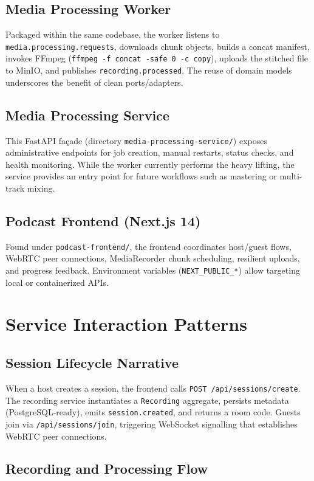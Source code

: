 \documentclass[12pt]{article}
\begin{document}
\subsection{Media Processing Worker}
Packaged within the same codebase, the worker listens to \texttt{media.processing.requests}, downloads chunk objects, builds a concat manifest, invokes FFmpeg (\texttt{ffmpeg -f concat -safe 0 -c copy}), uploads the stitched file to MinIO, and publishes \texttt{recording.processed}. The reuse of domain models underscores the benefit of clean ports/adapters.

\subsection{Media Processing Service}
This FastAPI façade (directory \texttt{media-processing-service/}) exposes administrative endpoints for job creation, manual restarts, status checks, and health monitoring. While the worker currently performs the heavy lifting, the service provides an entry point for future workflows such as mastering or multi-track mixing.

\subsection{Podcast Frontend (Next.js 14)}
Found under \texttt{podcast-frontend/}, the frontend coordinates host/guest flows, WebRTC peer connections, MediaRecorder chunk scheduling, resilient uploads, and progress feedback. Environment variables (\texttt{NEXT\_PUBLIC\_*}) allow targeting local or containerized APIs.

\clearpage
\section{Service Interaction Patterns}

\subsection{Session Lifecycle Narrative}
When a host creates a session, the frontend calls \texttt{POST /api/sessions/create}. The recording service instantiates a \texttt{Recording} aggregate, persists metadata (PostgreSQL-ready), emits \texttt{session.created}, and returns a room code. Guests join via \texttt{/api/sessions/join}, triggering WebSocket signalling that establishes WebRTC peer connections.

\subsection{Recording and Processing Flow}
\end{document}

